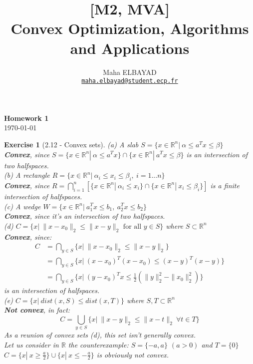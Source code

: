 \documentclass[11pt]{article}
\title{[M2, MVA]\\ Convex Optimization, Algorithms and Applications}
\author{Maha ELBAYAD\\ \href{mailto:maha.elbayad@student.ecp.fr}{\tt maha.elbayad@student.ecp.fr}}
\date{}
\theoremstyle{exo}
\newtheorem*{exercise}{Exercise}
\newcommand{\R}{\mathbb{R}}
\newcommand{\1}{\mathbf{1}}
\newcommand{\0}{\mathbf{0}}
\begin{document}
\maketitle
\vspace{-10pt}
\begin{center}
{\huge \bf Homework 1}\\
\today
\vspace{15pt}
\end{center}

\vspace{10pt}


\begin{exercise}[2.12 - Convex sets]

(a) A slab $S=\{x\in\R^n|\:\alpha\leq a^Tx\leq \beta\}$\\
\textbf{Convex}, since $S=\{x\in\R^n|\:\alpha\leq a^Tx\}\cap\{x\in\R^n|\:a^Tx\leq \beta\}$ is an intersection of two halfspaces.\\
(b) A rectangle $R=\{x\in\R^n|\:\alpha_i\leq x_i\leq\beta_i,\:i=1...n\}$\\
\textbf{Convex}, since $R=\bigcap\limits_{i=1}^n\left[\{x\in\R^n|\:\alpha_i\leq x_i\}\cap\{x\in\R^n|\:x_i\leq\beta_i\}\right]$ is a finite intersection of halfspaces.\\
(c) A wedge $W=\{x\in\R^n|\:a_1^Tx\leq b_1,\:a_2^Tx\leq b_2\}$\\
\textbf{Convex}, since it's an intersection of two halfspaces.\\
(d) $C=\{x|\:\|x-x_0\|_2\leq\|x-y\|_2\text{ for all }y\in S\}$ where $S\subset \R^n$\\
\textbf{Convex}, since:
\[
\begin{split}
C&=\bigcap\limits_{y\in S}\{x|\:\|x-x_0\|_2\leq\|x-y\|_2\}\\
&=\bigcap\limits_{y\in S}\{x|\:(x-x_0)^T(x-x_0)\leq(x-y)^T(x-y)\}\\
&=\bigcap\limits_{y\in S}\{x|\:(y-x_0)^Tx\leq \frac{1}{2}(\|y\|_2^2-\|x_0\|_2^2)\}
\end{split}
\]
is an intersection of halfspaces.\\
\break
(e) $C=\{x|\:dist(x,S)\leq dist(x,T)\}$ where $S,T\subset\R^n$\\
\textbf{Not convex}, in fact:
\[
C=\bigcup\limits_{y\in S}\{x|\:\|x-y\|_2\leq \|x-t\|_2\:\forall t\in T\}
\]
As a reunion of convex sets (d), this set isn't generally convex.\\
Let us consider in $\R$ the counterexample: $S=\{-a,a\}$ $(a>0)$ and $T=\{0\}$\\
$C=\{x|\:x\geq\frac{a}{2}\}\cup\{x|\:x\leq-\frac{a}{2}\}$ is obviously not convex.\\

\end{exercise}
\end{document}
